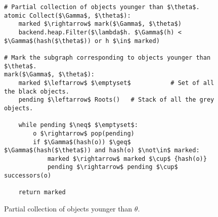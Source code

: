 \begin{figure}[!ht]
  \caption{Partial collection of objects younger than $\theta$.}
  \label{alg:partial-gen}

  \vspace{-.5em}
  \centering
  \begin{lstlisting}
# Partial collection of objects younger than $\theta$.
atomic Collect($\Gamma$, $\theta$):
    marked $\rightarrow$ mark($\Gamma$, $\theta$)
    backend.heap.Filter($\lambda$h. $\Gamma$(h) < $\Gamma$(hash($\theta$)) or h $\in$ marked)

# Mark the subgraph corresponding to objects younger than $\theta$.
mark($\Gamma$, $\theta$):
    marked $\leftarrow$ $\emptyset$           # Set of all the black objects.
    pending $\leftarrow$ Roots()   # Stack of all the grey objects.

    while pending $\neq$ $\emptyset$:
        o $\rightarrow$ pop(pending)
        if $\Gamma$(hash(o)) $\geq$ $\Gamma$(hash($\theta$)) and hash(o) $\not\in$ marked:
            marked $\rightarrow$ marked $\cup$ {hash(o)}
            pending $\rightarrow$ pending $\cup$ successors(o)

    return marked
\end{lstlisting}
\end{figure}
